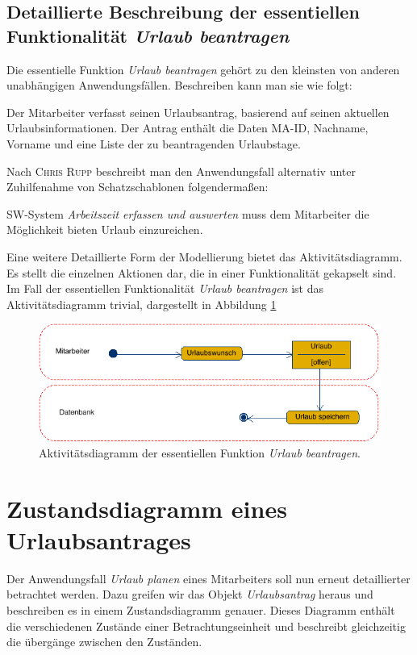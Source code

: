 \newpage

\section{Detaillierte Beschreibung der essentiellen Funktionalität \textit{Urlaub beantragen}}
Die essentielle Funktion \textit{Urlaub beantragen} gehört zu den kleinsten von anderen unabhängigen Anwendungsfällen. Beschreiben kann man sie wie folgt: \newline

Der Mitarbeiter verfasst seinen Urlaubsantrag, basierend auf seinen aktuellen Urlaubsinformationen. Der Antrag enthält die Daten MA-ID, Nachname, Vorname und eine Liste der zu beantragenden Urlaubstage. \newline

Nach \textsc{Chris Rupp} beschreibt man den Anwendungsfall alternativ unter Zuhilfenahme von Schatzschablonen folgenderma{\ss}en: \newline

SW-System \textit{Arbeitszeit erfassen und auswerten} muss dem Mitarbeiter die Möglichkeit bieten Urlaub einzureichen. \newline

Eine weitere Detaillierte Form der Modellierung bietet das Aktivitätsdiagramm. Es stellt die einzelnen Aktionen dar, die in einer Funktionalität gekapselt sind. Im Fall der essentiellen Funktionalität \textit{Urlaub beantragen} ist das Aktivitätsdiagramm trivial, dargestellt in Abbildung \ref{Aktivitaet}

\vspace{1cm}
\begin{figure}[hbp]
	\centering
	\includegraphics[width=\linewidth]{UML/Export/Urlaub_einreichen.png}
	\caption{Aktivitätsdiagramm der essentiellen Funktion \textit{Urlaub beantragen}.}
	\label{Aktivitaet}
\end{figure}

\chapter{Zustandsdiagramm eines Urlaubsantrages}
Der Anwendungsfall \textit{Urlaub planen} eines Mitarbeiters soll nun erneut detaillierter betrachtet werden. Dazu greifen wir das Objekt \textit{Urlaubsantrag} heraus und beschreiben es in einem Zustandsdiagramm genauer. Dieses Diagramm enthält die verschiedenen Zustände einer Betrachtungseinheit und beschreibt gleichzeitig die übergänge zwischen den Zuständen.

